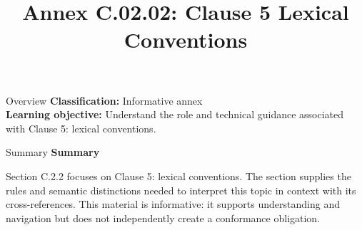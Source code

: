\documentclass[10pt,letterpaper]{article}
\title{Annex C.02.02: Clause 5 Lexical Conventions}
\author{}
\date{}
\begin{document}
\maketitle
\begin{CornellOverviewBox}{Overview}
\textbf{Classification:} Informative annex\\[2pt]
\textbf{Learning objective:} Understand the role and technical guidance associated with Clause 5: lexical conventions.
\end{CornellOverviewBox}\begin{CornellSummaryBox}{Summary}
{\sffamily\bfseries\color{Accent} Summary}\par\vspace{3pt}Section C.2.2 focuses on Clause 5: lexical conventions. The section supplies the rules and semantic distinctions needed to interpret this topic in context with its cross-references. This material is informative: it supports understanding and navigation but does not independently create a conformance obligation.
\end{CornellSummaryBox}
\end{document}
